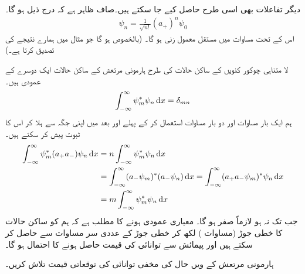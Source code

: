 دیگر تفاعلات بھی اسی طرح حاصل کیے جا سکتے ہیں۔صاف ظاہر ہے کہ درج ذیل ہو گا۔ 
\begin{align}\label{مساوات_شروڈنگر_ہارمونی_ساکن_حالات}
\psi_n = \frac{1}{ \sqrt{n!} } ( a_+ )^n \psi_0
\end{align}
اس کے تحت مساوات  میں مستقل معمول زنی  ہو گا۔ (بالخصوص  ہو گا جو مثال  میں ہمارے نتیجے کی تصدیق کرتا ہے۔)
 
لا متناہی چوکور کنویں  کے ساکن حالات کی طرح ہارمونی مرتعش کے ساکن حالات ایک دوسرے کے عمودی ہیں۔ 
\begin{align}
\int_{ - \infty }^{ \infty } \psi_m^*\psi_n \dif x = \delta_{mn}
\end{align}
ہم ایک بار مساوات  اور دو بار مساوات  استعمال کر کے پہلے  اور بعد میں  اپنی جگہ سے ہلا کر اس کا ثبوت پیش کر سکتے ہیں۔
\begin{align*}
\int_{ - \infty }^{ \infty } \psi_m^*(a_+ a_- )\psi_n \dif x &= n \int_{ - \infty }^{ \infty } \psi_m^* \psi_n \dif x
\\
&=\int_{ - \infty }^{ \infty } ( a_- \psi_m )^*( a_- \psi_n ) \dif x = \int_{ - \infty }^{ \infty } ( a_+ a_- \psi_m)^* \psi_n \dif x\\
&= m \int_{ - \infty }^{ \infty } \psi_m^* \psi_n \dif x
\end{align*}
جب تک  نہ ہو  لازماً صفر ہو گا۔ معیاری عمودی ہونے کا مطلب ہے کہ ہم 
 کو ساکن حالات کا خطی جوڑ (مساوات ) لکھ کر خطی جوڑ کے عددی سر مساوات  سے حاصل کر سکتے ہیں اور پیمائش سے توانائی کی قیمت  حاصل ہونے کا احتمال  ہو گا۔

ہارمونی مرتعش کے  ویں حال کی مخفی توانائی کی توقعاتی قیمت تلاش کریں۔

